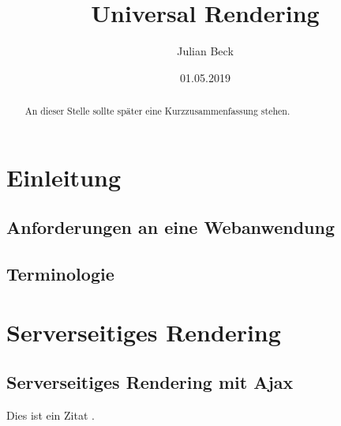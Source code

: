 \documentclass[runningheads]{llncs}
\title{Universal Rendering}
\author{Julian Beck}
\institute{Betreuer: Prof. Dr. rer. nat. Christian Zirpins}
\date{01.05.2019}
\begin{document}
\let\oldaddcontentsline\addcontentsline
\def\addcontentsline#1#2#3{}
\maketitle
\def\addcontentsline#1#2#3{\oldaddcontentsline{#1}{#2}{#3}}


\begin{abstract}
  An dieser Stelle sollte später eine Kurzzusammenfassung stehen.
\end{abstract}

\tableofcontents 
\newpage

\section{Einleitung}
\label{sec:Einleitung}


\subsection{Anforderungen an eine Webanwendung}
\label{subsec:Anforderungen an eine Webanwendung}

\subsection{Terminologie}
\label{subsec:Anforderungen an eine Webanwendung}


\section{Serverseitiges Rendering}
\label{sec:Serverseitiges Rendering}


\subsection{Serverseitiges Rendering mit Ajax}
\label{subsec:Serverseitiges Rendering mit Ajax}



Dies ist ein Zitat \cite{becker2008a}.
\end{document}
